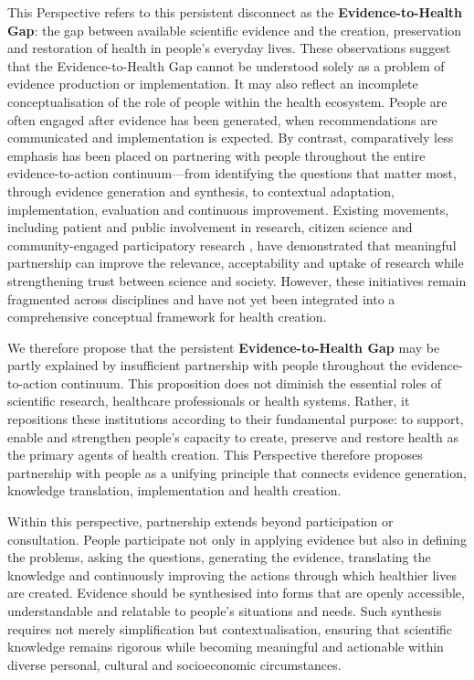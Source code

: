 \documentclass{article}
\begin{document}
This Perspective refers to this persistent disconnect as the \textbf{\textbf{Evidence-to-Health Gap}}: the gap between available scientific evidence and the creation, preservation and restoration of health in people's everyday lives. These observations suggest that the Evidence-to-Health Gap cannot be understood solely as a problem of evidence production or implementation. It may also reflect an incomplete conceptualisation of the role of people within the health ecosystem. People are often engaged after evidence has been generated, when recommendations are communicated and implementation is expected. By contrast, comparatively less emphasis has been placed on partnering with people throughout the entire evidence-to-action continuum—from identifying the questions that matter most, through evidence generation and synthesis, to contextual adaptation, implementation, evaluation and continuous improvement. Existing movements, including patient and public involvement in research, citizen science and community-engaged participatory research  \cite{Israel1998} \cite{Bonney2009} \cite{Greenhalgh2016} \cite{PCORI2018} \cite{WHOIPCHS2016} \cite{UNESCO2021}, have demonstrated that meaningful partnership can improve the relevance, acceptability and uptake of research while strengthening trust between science and society. However, these initiatives remain fragmented across disciplines and have not yet been integrated into a comprehensive conceptual framework for health creation.

We therefore propose that the persistent \textbf{\textbf{Evidence-to-Health Gap}} may be partly explained by insufficient partnership with people throughout the evidence-to-action continuum. This proposition does not diminish the essential roles of scientific research, healthcare professionals or health systems. Rather, it repositions these institutions according to their fundamental purpose: to support, enable and strengthen people's capacity to create, preserve and restore health as the primary agents of health creation. This Perspective therefore proposes partnership with people as a unifying principle that connects evidence generation, knowledge translation, implementation and health creation.

Within this perspective, partnership extends beyond participation or consultation. People participate not only in applying evidence but also in defining the problems, asking the questions, generating the evidence, translating the knowledge and continuously improving the actions through which healthier lives are created. Evidence should be synthesised into forms that are openly accessible, understandable and relatable to people's situations and needs. Such synthesis requires not merely simplification but contextualisation, ensuring that scientific knowledge remains rigorous while becoming meaningful and actionable within diverse personal, cultural and socioeconomic circumstances.
\end{document}
